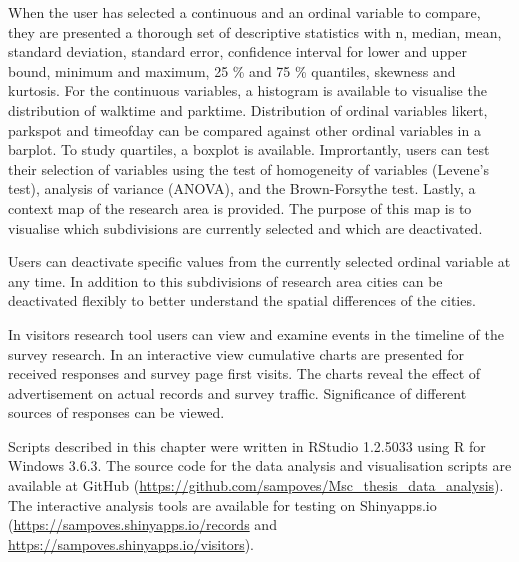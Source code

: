 When the user has selected a continuous and an ordinal variable to compare, they are presented a thorough set of descriptive statistics with n, median, mean, standard deviation, standard error, confidence interval for lower and upper bound, minimum and maximum, 25 \% and 75 \% quantiles, skewness and kurtosis. For the continuous variables, a histogram is available to visualise the distribution of walktime and parktime. Distribution of ordinal variables likert, parkspot and timeofday can be compared against other ordinal variables in a barplot. To study quartiles, a boxplot is available. Imprortantly, users can test their selection of variables using the test of homogeneity of variables (Levene's test), analysis of variance (ANOVA), and the Brown-Forsythe test. Lastly, a context map of the research area is provided. The purpose of this map is to visualise which subdivisions are currently selected and which are deactivated.

Users can deactivate specific values from the currently selected ordinal variable at any time. In addition to this subdivisions of research area cities can be deactivated flexibly to better understand the spatial differences of the cities.

In visitors research tool users can view and examine events in the timeline of the survey research. In an interactive view cumulative charts are presented for received responses and survey page first visits. The charts reveal the effect of advertisement on actual records and survey traffic. Significance of different sources of responses can be viewed.

Scripts described in this chapter were written in RStudio 1.2.5033 using R for Windows 3.6.3. The source code for the data analysis and visualisation scripts are available at GitHub (\textcolor{blue}{\url{https://github.com/sampoves/Msc_thesis_data_analysis}}). The interactive analysis tools are available for testing on Shinyapps.io (\textcolor{blue}{\url{https://sampoves.shinyapps.io/records}} and  \textcolor{blue}{\url{https://sampoves.shinyapps.io/visitors}}). 
